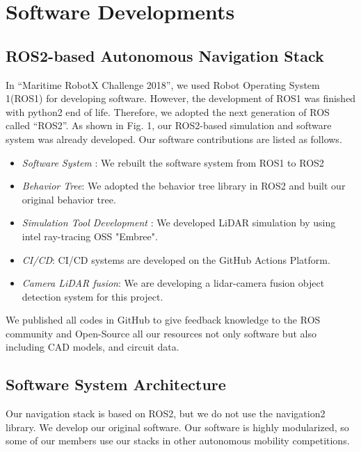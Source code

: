 \documentclass[lettersize,journal]{IEEEtran}
\begin{document}
\section{Software Developments}
\subsection{ROS2-based Autonomous Navigation Stack}
In “Maritime RobotX Challenge 2018”, we used Robot Operating System 1(ROS1) for developing software.
However, the development of ROS1 was finished with python2 end of life.
Therefore, we adopted the next generation of ROS called “ROS2”.
As shown in Fig. 1, our ROS2-based simulation and software system was already developed.
Our software contributions are listed as follows.

\begin{itemize}
  \item {\it Software System }:
    We rebuilt the software system from ROS1 to ROS2
  \item {\it Behavior Tree}:
    We adopted the behavior tree library in ROS2 and built our original behavior tree.
  \item {\it Simulation Tool Development }:
    We developed LiDAR simulation by using intel ray-tracing OSS "Embree".
  \item {\it CI/CD}:
    CI/CD systems are developed on the GitHub Actions Platform.
  \item {\it Camera LiDAR fusion}:
    We are developing a lidar-camera fusion object detection system for this project.
\end{itemize}
We published all codes in GitHub to give feedback knowledge to the ROS community and 
Open-Source all our resources not only software but also including CAD models, and circuit data.

\subsection{Software System Architecture}
Our navigation stack is based on ROS2, but we do not use the navigation2 library. We develop our original software.
Our software is highly modularized, so some of our members use our stacks in other autonomous mobility competitions.
\end{document}
